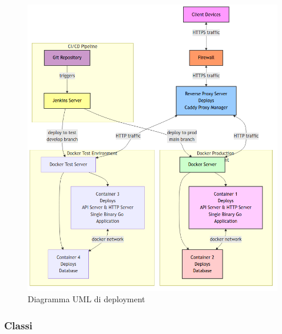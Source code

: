 \documentclass{article}
\begin{document}
\begin{figure}[H]
    \centering
    \includegraphics[width=12cm]{uml-deployment}
    \caption{Diagramma UML di deployment}
    \label{fig:deployment}
\end{figure}

\subsubsection{Classi}
\end{document}
